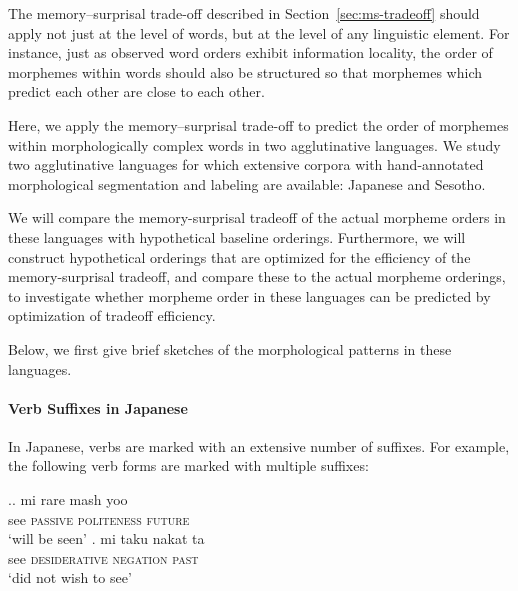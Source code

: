 
The memory--surprisal trade-off described in Section~\ref{sec:ms-tradeoff} should apply not just at the level of words, but at the level of any linguistic element.
For instance, just as observed word orders exhibit information locality, the order of morphemes within words should also be structured so that morphemes which predict each other are close to each other.

Here, we apply the memory--surprisal trade-off to predict the order of morphemes within morphologically complex words in two agglutinative languages. We study two agglutinative languages for which extensive corpora with hand-annotated morphological segmentation and labeling are available: Japanese and Sesotho. 

We will compare the memory-surprisal tradeoff of the actual morpheme orders in these languages with hypothetical baseline orderings.
Furthermore, we will construct hypothetical orderings that are optimized for the efficiency of the memory-surprisal tradeoff, and compare these to the actual morpheme orderings, to investigate whether morpheme order in these languages can be predicted by optimization of tradeoff efficiency.

Below, we first give brief sketches of the morphological patterns in these languages. 


\paragraph{Verb Suffixes in Japanese}

In Japanese, verbs are marked with an extensive number of suffixes. For example, the following verb forms are marked with multiple suffixes:

\ex.\ag. mi  rare mash yoo \\
see  \textsc{passive}  \textsc{politeness}  \textsc{future} \\
`will be seen'
\bg. mi taku nakat ta \\
see \textsc{desiderative} \textsc{negation} \textsc{past} \\
`did not wish to see'

